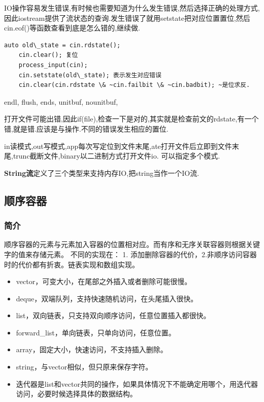 IO操作容易发生错误,有时候也需要知道为什么发生错误,然后选择正确的处理方式,因此iostream提供了流状态的查询.发生错误了就用setstate把对应位置置位,然后cin.eof()等函数查看到底是怎么错的,继续做.
\begin{lstlisting}[caption={}]
	auto old\_state = cin.rdstate();
	cin.clear(); 复位
	process_input(cin);
	cin.setstate(old\_state); 表示发生对应错误
	cin.clear(cin.rdstate \& ~cin.failbit \& ~cin.badbit); ~是位求反.
\end{lstlisting}

endl, flush, ends, unitbuf, nounitbuf,

打开文件可能出错,因此if(file),检查一下是对的,其实就是检查前文的rdstate,有一个错,就是错.应该是与操作.不同的错误发生相应的置位.

in读模式,out写模式,app每次写定位到文件末尾,ate打开文件后立即到文件末尾,trunc截断文件,binary以二进制方式打开文件io. 可以指定多个模式.

\textbf{String流}定义了三个类型来支持内存IO,把string当作一个IO流.

\subsection{顺序容器}
\subsubsection{简介}
顺序容器的元素与元素加入容器的位置相对应。而有序和无序关联容器则根据关键字的值来存储元素。
不同的实现在：
	1. 添加删除容器的代价，2.非顺序访问容器时的代价都有折衷。链表实现和数组实现。
\begin{itemize}
	\item vector，可变大小，在尾部之外插入或者删除可能很慢。
	\item deque，双端队列，支持快速随机访问，在头尾插入很快。
	\item list，双向链表，只支持双向顺序访问，任意位置插入都很快。
	\item forward\_list，单向链表，只单向访问，任意位置。
	\item array，固定大小，快速访问，不支持插入删除。
	\item string，与vector相似，但只原来保存字符。
	\item 迭代器是list和vector共同的操作，如果具体情况下不能确定用哪个，用迭代器访问，必要时候选择具体的数据结构。
\end{itemize}

